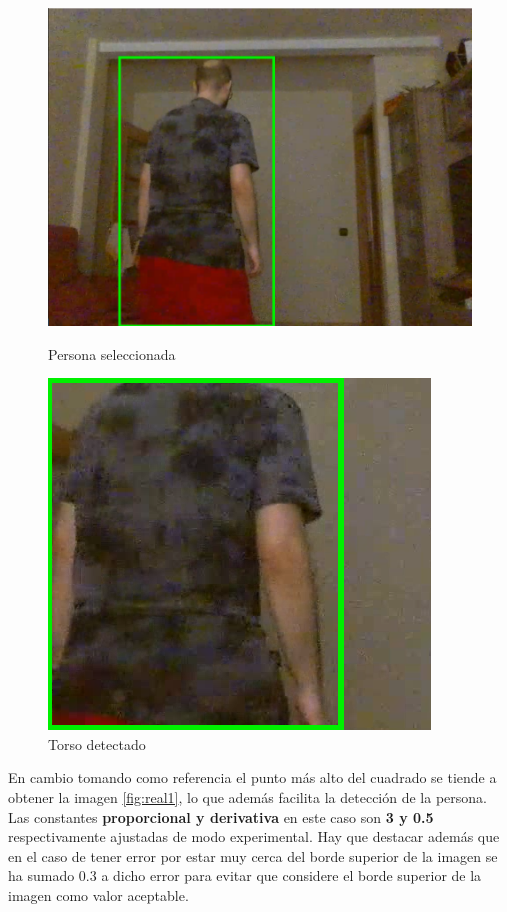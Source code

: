 \begin{figure}[!htb]
    \includegraphics[width=\linewidth]{figures/real/cap1.png}
    \caption{Persona seleccionada}\label{fig:real1}
\endminipage\hfill
{}
    \includegraphics[width=\linewidth]{figures/real/cap2.png}
    \caption{Torso detectado}\label{fig:real2}
\endminipage\hfill
\end{figure}

En cambio tomando como referencia el punto más alto del cuadrado se tiende a obtener la imagen \ref{fig:real1}, lo que además facilita la detección de la persona.
Las constantes \textbf{proporcional y derivativa} en este caso son \textbf{3 y 0.5} respectivamente ajustadas de modo experimental. Hay que destacar además que en el caso de tener error por estar muy cerca del borde superior de la imagen se ha sumado 0.3 a dicho error para evitar que considere el borde  superior de la imagen como valor aceptable. 


